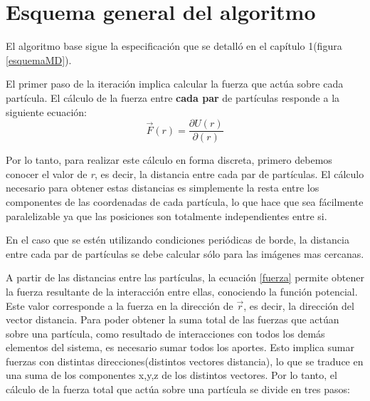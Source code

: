 \section{Esquema general del algoritmo}

El algoritmo base sigue la especificación que se detalló en el capítulo 1(figura \ref{esquemaMD}). 

El primer paso de la iteración implica calcular la fuerza que actúa sobre cada partícula. 
El cálculo de la fuerza entre \textbf{cada par} de partículas responde a la siguiente ecuación: \begin{equation} \label{fuerza}\vec{F}(r)=\dfrac{\partial U(r)}{ \partial(r)}\end{equation}
                                                                                                                                                   
Por lo tanto, para realizar este cálculo en forma discreta, primero debemos conocer el valor de \textit{r}, es decir, la distancia entre cada par de partículas.
El cálculo necesario para obtener estas distancias es simplemente la resta entre los componentes de las coordenadas de cada partícula, lo que hace que sea fácilmente paralelizable 
ya que las posiciones son totalmente independientes entre si. 

En el caso que se estén utilizando condiciones periódicas de borde, la distancia entre cada par de partículas se debe calcular sólo para las imágenes mas cercanas.

A partir de las distancias entre las partículas, la ecuación \ref{fuerza} permite obtener la fuerza resultante de la interacción entre ellas, conociendo la función potencial.
Este valor corresponde a la fuerza en la dirección de $\vec{r}$, es decir, la dirección del vector distancia. 
Para poder obtener la suma total de las fuerzas que actúan sobre una partícula, como resultado de interacciones con todos los demás elementos del sistema,
es necesario sumar todos los aportes. Esto implica sumar fuerzas con distintas direcciones(distintos vectores distancia), lo que se traduce en una suma de los componentes x,y,z de los distintos vectores. 
Por lo tanto, el cálculo de la fuerza total que actúa sobre una partícula se divide en tres pasos:

